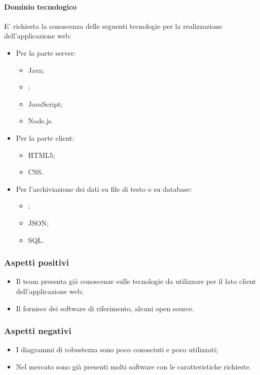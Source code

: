 			\paragraph{Dominio tecnologico} \Spazio
			E' richiesta la conoscenza delle seguenti tecnologie per la realizzazione dell'applicazione web:
				\begin{itemize}
					\item Per la parte server:
					\begin{itemize}
						\item Java;
						\item {};
						\item JavaScript;
						\item Node.js.
					\end{itemize}
					\item Per la parte client:
					\begin{itemize}
						\item HTML5;
						\item CSS.
					\end{itemize}
					\item Per l'archiviazione dei dati su file di testo o su database:
					\begin{itemize}
						\item {};
						\item JSON;
						\item SQL.
					\end{itemize}
				\end{itemize}
		\subsubsection{Aspetti positivi}
		\begin{itemize}
			\item Il team presenta già conoscenze sulle tecnologie da utilizzare per il lato client dell'applicazione web;
			\item Il  fornisce dei software di riferimento, alcuni open source.
		\end{itemize}
		\subsubsection{Aspetti negativi}
		\begin{itemize}
			\item I diagrammi di robustezza sono poco conosciuti e poco utilizzati;
			\item Nel mercato sono già presenti molti software con le caratteristiche richieste.
		\end{itemize}
